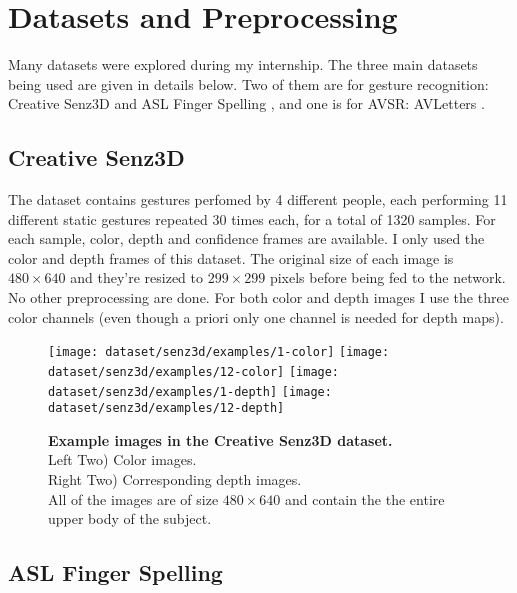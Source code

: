 \section{Datasets and Preprocessing} \label{section:dataset}

Many datasets were explored during my internship. The three main datasets
being used are given in details  below. Two of them are for gesture
recognition:
Creative Senz3D \cite{A. Memo 2015, A. Memo 2017} and ASL Finger Spelling
\cite{N. Pugeault 2011}, and one is for AVSR: AVLetters
\cite{I. Matthews 2002}.

\subsection{Creative Senz3D}

The dataset contains gestures perfomed by 4 different people, each
performing 11 different static gestures repeated 30 times each,
for a total of 1320 samples.
For each sample, color, depth and confidence frames are available.
I only used the color and depth frames of this dataset. The original
size of each image is $480 \times 640$ and they're resized to
$299 \times 299$ pixels before being fed to the network. No other
preprocessing are done. For both color and depth images I use the three
color channels (even though a priori only one channel is needed for
depth maps).

\begin{figure}[H]
  \centering
  \hfill
  \texttt{[image: dataset/senz3d/examples/1-color]}
  \hfill
  \texttt{[image: dataset/senz3d/examples/12-color]}
  \hfill
  \texttt{[image: dataset/senz3d/examples/1-depth]}
  \hfill
  \texttt{[image: dataset/senz3d/examples/12-depth]}
  \caption{%
    \textbf{Example images in the Creative Senz3D dataset.}\\[0.1em]
    Left Two) Color images.\\[0.1em]
    Right Two) Corresponding depth images.\\[0.1em]
    All of the images are of size $480 \times 640$ and contain the
      the entire upper body of the subject.}
  \label{fig:senz3d_exs}
\end{figure}

\subsection{ASL Finger Spelling}

